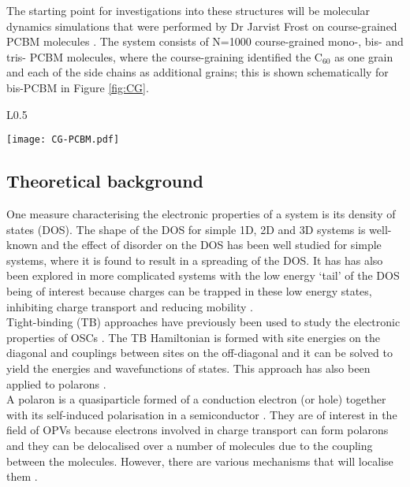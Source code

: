 \documentclass[a4paper,12pt]{article}
\begin{document}
\noindent The starting point for investigations into these structures will be molecular dynamics simulations that were performed by Dr Jarvist Frost on course-grained PCBM molecules \cite{Steiner}. The system consists of N=1000 course-grained mono-, bis- and tris- PCBM molecules, where the course-graining identified the C$_{60}$ as one grain and each of the side chains as additional grains; this is shown schematically for bis-PCBM in Figure \ref{fig:CG}.

\begin{wrapfigure}{L}{0.5\textwidth}
\begin{center}
\texttt{[image: CG-PCBM.pdf]}
\end{center}
\caption{The grains for course-graining in MD simulations, shown schematically for bis-PCBM \cite{bispcbm}}
\label{fig:CG}
\end{wrapfigure}


\subsection{Theoretical background}

\noindent One measure characterising the electronic properties of a system is its density of states (DOS). The shape of the DOS for simple 1D, 2D and 3D systems is well-known \cite{Thorpe} and the effect of disorder on the DOS has been well studied for simple systems, where it is found to result in a spreading of the DOS. It has has also been explored in more complicated systems with the low energy `tail' of the DOS being of interest because charges can be trapped in these low energy states, inhibiting charge transport and reducing mobility \cite{Savoie2014a} \cite{Fehske2006} \cite{Welborn2012}. \\

\noindent Tight-binding (TB) approaches have previously been used to study the electronic properties of OSCs \cite{Prins2006} \cite{Mizes1995}. The TB Hamiltonian is formed with site energies on the diagonal and couplings between sites on the off-diagonal and it can be solved to yield the energies and wavefunctions of states. This approach has also been applied to polarons \cite{Molecular-crystal1959} \cite{Klamt1987}. \\ 

\noindent  A polaron is a quasiparticle formed of a conduction electron (or hole) together with its self-induced polarisation in a semiconductor \cite{Devreese1996}. They are of interest in the field of OPVs because electrons involved in charge transport can form polarons \cite{Savoie2014} and they can be delocalised over a number of molecules due to the coupling between the molecules. However, there are various mechanisms that will localise them \cite{PolaronBook}.\\
\end{document}
